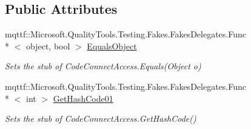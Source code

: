 \subsection*{Public Attributes}
\begin{DoxyCompactItemize}
\item 
mqttf\-::\-Microsoft.\-Quality\-Tools.\-Testing.\-Fakes.\-Fakes\-Delegates.\-Func\\*
$<$ object, bool $>$ \hyperlink{class_system_1_1_security_1_1_policy_1_1_fakes_1_1_stub_code_connect_access_a6b75ced430831e9f9a9ac877d02eeba1}{Equals\-Object}
\begin{DoxyCompactList}\small\item\em Sets the stub of Code\-Connect\-Access.\-Equals(\-Object o)\end{DoxyCompactList}\item 
mqttf\-::\-Microsoft.\-Quality\-Tools.\-Testing.\-Fakes.\-Fakes\-Delegates.\-Func\\*
$<$ int $>$ \hyperlink{class_system_1_1_security_1_1_policy_1_1_fakes_1_1_stub_code_connect_access_a91d07aefeaf8d62abe41d85edda0fad9}{Get\-Hash\-Code01}
\begin{DoxyCompactList}\small\item\em Sets the stub of Code\-Connect\-Access.\-Get\-Hash\-Code()\end{DoxyCompactList}\end{DoxyCompactItemize}

